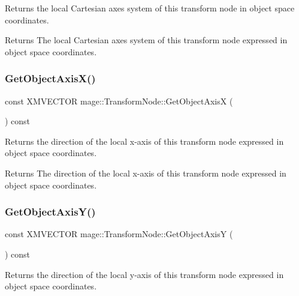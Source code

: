 Returns the local Cartesian axes system of this transform node in object space coordinates.

\begin{DoxyReturn}{Returns}
The local Cartesian axes system of this transform node expressed in object space coordinates. 
\end{DoxyReturn}
\hypertarget{classmage_1_1_transform_node_a6a6375218a90d18163aeec59d91a68e2}{}\label{classmage_1_1_transform_node_a6a6375218a90d18163aeec59d91a68e2} 
\subsubsection{\texorpdfstring{Get\+Object\+Axis\+X()}{GetObjectAxisX()}}
{\footnotesize\ttfamily const X\+M\+V\+E\+C\+T\+OR mage\+::\+Transform\+Node\+::\+Get\+Object\+AxisX (\begin{DoxyParamCaption}{ }\end{DoxyParamCaption}) const}

Returns the direction of the local x-\/axis of this transform node expressed in object space coordinates.

\begin{DoxyReturn}{Returns}
The direction of the local x-\/axis of this transform node expressed in object space coordinates. 
\end{DoxyReturn}
\hypertarget{classmage_1_1_transform_node_a807df3821f17d6b7ce1f7ca5a56b552d}{}\label{classmage_1_1_transform_node_a807df3821f17d6b7ce1f7ca5a56b552d} 
\subsubsection{\texorpdfstring{Get\+Object\+Axis\+Y()}{GetObjectAxisY()}}
{\footnotesize\ttfamily const X\+M\+V\+E\+C\+T\+OR mage\+::\+Transform\+Node\+::\+Get\+Object\+AxisY (\begin{DoxyParamCaption}{ }\end{DoxyParamCaption}) const}

Returns the direction of the local y-\/axis of this transform node expressed in object space coordinates.

